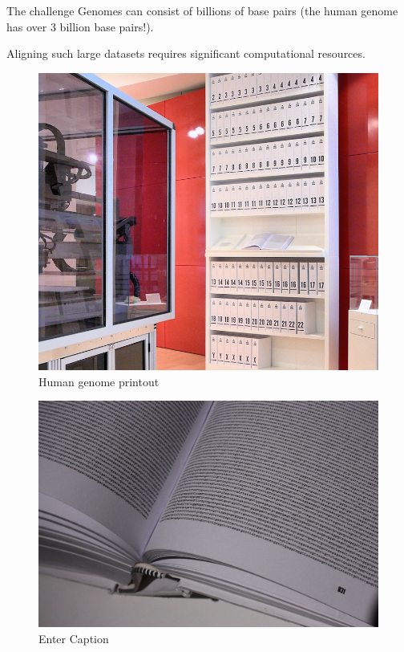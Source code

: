     \begin{frame}{The challenge}
        Genomes can consist of billions of base pairs (the human genome has over 3 billion base pairs!).
        
        Aligning such large datasets requires significant computational resources.

        \vspace{10pt}

    \begin{minipage}{0.49\linewidth}
        \begin{figure}
                \includegraphics[width=0.8\linewidth]{human_genome_printout.png}
                \caption{Human genome printout}
            \end{figure}
    \end{minipage}
    \begin{minipage}{0.49\linewidth}
        \begin{figure}
            \includegraphics[width=1\linewidth]{human_genome_book.JPG}
            \caption{Enter Caption}
        \end{figure}
    \end{minipage}
    \end{frame}


